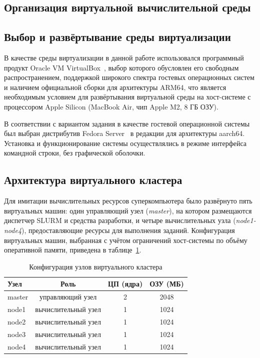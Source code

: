 \subsection{Организация виртуальной вычислительной среды}
\subsection*{Выбор и развёртывание среды виртуализации}
В качестве среды виртуализации в данной работе использовался
программный продукт Oracle VM VirtualBox~\cite{oracle2024vbox}, выбор которого обусловлен
его свободным распространением, поддержкой широкого спектра
гостевых операционных систем и наличием официальной сборки для
архитектуры ARM64, что является необходимым условием для
развёртывания виртуальной среды на хост-системе с процессором Apple
Silicon (MacBook Air, чип Apple M2, 8 ГБ ОЗУ).

В соответствии с вариантом задания в качестве гостевой операционной
системы был выбран дистрибутив Fedora Server~\cite{fedora2024docs} в редакции для
архитектуры aarch64. Установка и функционирование системы
осуществлялись в режиме интерфейса командной строки, без
графической оболочки.

\subsection*{Архитектура виртуального кластера}
Для имитации вычислительных ресурсов суперкомпьютера было развёрнуто
пять виртуальных машин: один управляющий узел (\textit{master}), на котором размещаются диспетчер SLURM и средства разработки,
и четыре вычислительных узла (\textit{node1-node4}), предоставляющие
ресурсы для выполнения заданий. Конфигурация виртуальных машин,
выбранная с учётом ограничений хост-системы по объёму оперативной
памяти, приведена в таблице~\ref{tab:nodes_config}.

\begin{table}[H]
\caption{Конфигурация узлов виртуального кластера}
\label{tab:nodes_config}
\centering
\begin{tabular}{|l|c|c|c|}
\hline
Узел & Роль & ЦП (ядра) & ОЗУ (МБ) \\
\hline
master & управляющий узел & 2 & 2048 \\
node1 & вычислительный узел & 1 & 1024 \\
node2 & вычислительный узел & 1 & 1024 \\
node3 & вычислительный узел & 1 & 1024 \\
node4 & вычислительный узел & 1 & 1024 \\
\hline
\end{tabular}
\end{table}

